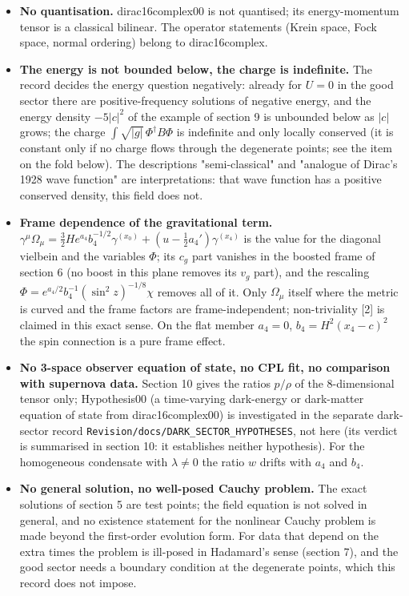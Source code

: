 \documentclass[11pt]{article}
\begin{document}
\begin{itemize}
\item \textbf{No quantisation.} dirac16complex00 is not quantised; its energy-momentum tensor is a classical bilinear. The operator statements (Krein space, Fock space, normal ordering) belong to dirac16complex.
\item \textbf{The energy is not bounded below, the charge is indefinite.} The record decides the energy question negatively: already for $U = 0$ in the good sector there are positive-frequency solutions of negative energy, and the energy density $-5|c|^2$ of the example of section 9 is unbounded below as $|c|$ grows; the charge $\int\sqrt{|g|}\,\Phi^\dagger B\Phi$ is indefinite and only locally conserved (it is constant only if no charge flows through the degenerate points; see the item on the fold below). The descriptions "semi-classical" and "analogue of Dirac's 1928 wave function" are interpretations: that wave function has a positive conserved density, this field does not.
\item \textbf{Frame dependence of the gravitational term.} $\gamma^\mu\Omega_\mu = \tfrac32He^{a_4}b_4^{-1/2}\gamma^{(x_0)} + (u - \tfrac12a_4')\gamma^{(x_4)}$ is the value for the diagonal vielbein and the variables $\Phi$; its $c_g$ part vanishes in the boosted frame of section 6 (no boost in this plane removes its $v_g$ part), and the rescaling $\Phi = e^{a_4/2}b_4^{-1}(\sin^2 z)^{-1/8}\chi$ removes all of it. Only $\Omega_\mu$ itself where the metric is curved and the frame factors are frame-independent; non-triviality [2] is claimed in this exact sense. On the flat member $a_4 = 0$, $b_4 = H^2(x_4 - c)^2$ the spin connection is a pure frame effect.
\item \textbf{No 3-space observer equation of state, no CPL fit, no comparison with supernova data.} Section 10 gives the ratios $p/\rho$ of the 8-dimensional tensor only; Hypothesis00 (a time-varying dark-energy or dark-matter equation of state from dirac16complex00) is investigated in the separate dark-sector record \texttt{Revision\allowbreak{}/docs/DA\allowbreak{}RK\_SECTO\allowbreak{}R\_HYPOTH\allowbreak{}ESES}, not here (its verdict is summarised in section 10: it establishes neither hypothesis). For the homogeneous condensate with $\lambda \ne 0$ the ratio $w$ drifts with $a_4$ and $b_4$.
\item \textbf{No general solution, no well-posed Cauchy problem.} The exact solutions of section 5 are test points; the field equation is not solved in general, and no existence statement for the nonlinear Cauchy problem is made beyond the first-order evolution form. For data that depend on the extra times the problem is ill-posed in Hadamard's sense (section 7), and the good sector needs a boundary condition at the degenerate points, which this record does not impose.

\end{itemize}
\end{document}

